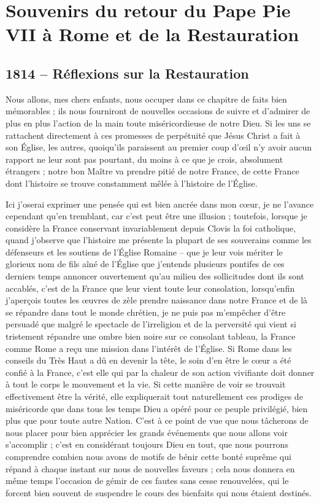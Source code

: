 \documentclass[11pt,a4paper]{report}
\begin{document}
\chapter{Souvenirs du retour du Pape Pie VII à Rome et de la Restauration}

\section*{1814 -- Réflexions sur la Restauration}

Nous allons, mes chers enfants, nous occuper dans ce chapitre de faits bien mémorables ; ils nous fourniront de nouvelles occasions de suivre et d'admirer de plus en plus l'action de la main toute miséricordieuse de notre Dieu. Si les uns se rattachent directement à ces promesses de perpétuité que Jésus Christ a fait à son Église, les autres, quoiqu'ils paraissent au premier coup d'œil n'y avoir aucun rapport ne leur sont pas pourtant, du moins à ce que je crois, absolument étrangers ; notre bon Maître va prendre pitié de notre France, de cette France dont l'histoire se trouve constamment mêlée à l'histoire de l'Église.

Ici j'oserai exprimer une pensée qui est bien ancrée dans mon cœur, je ne l'avance cependant qu'en tremblant, car c'est peut être une illusion ; toutefois, lorsque je considère la France conservant invariablement depuis Clovis la foi catholique, quand j'observe que l'histoire me présente la plupart de ses souverains comme les défenseurs et les soutiens de l'Église Romaine -- que je leur vois mériter le glorieux nom de fils aîné de l'Église que j'entends plusieurs pontifes de ces derniers temps annoncer ouvertement qu'au milieu des sollicitudes dont ils sont accablés, c'est de la France que leur vient toute leur consolation, lorsqu'enfin j'aperçois toutes les œuvres de zèle prendre naissance dans notre France et de là se répandre dans tout le monde chrétien, je ne puis pas m'empêcher d'être persuadé que malgré le spectacle de l'irreligion et de la perversité qui vient si tristement répandre une ombre bien noire sur ce consolant tableau, la France comme Rome a reçu une mission dans l'intérêt de l'Église. Si Rome dans les conseils du Très Haut a dû en devenir la tête, le soin d'en être le cœur a été confié à la France, c'est elle qui par la chaleur de son action vivifiante doit donner à tout le corps le mouvement et la vie. Si cette manière de voir se trouvait effectivement être la vérité, elle expliquerait tout naturellement ces prodiges de miséricorde que dans tous les temps Dieu a opéré pour ce peuple privilégié, bien plus que pour toute autre Nation. C'est à ce point de vue que nous tâcherons de nous placer pour bien apprécier les grands événements que nous allons voir s'accomplir ; c'est en considérant toujours Dieu en tout, que nous pourrons comprendre combien nous avons de motifs de bénir cette bonté suprême qui répand à chaque instant sur nous de nouvelles faveurs ; cela nous donnera en même temps l'occasion de gémir de ces fautes sans cesse renouvelées, qui le forcent bien souvent de suspendre le cours des bienfaits qui nous étaient destinés.
\end{document}

